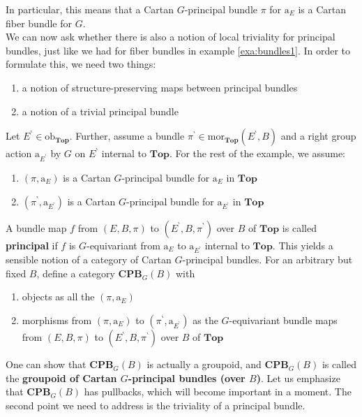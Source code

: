 \begin{exa}[Bundles 2]
In particular, this means that a Cartan $G$-principal bundle $\pi$ for $\mathrm{a}_{E}$ is a Cartan fiber bundle for $G$.
\\
We can now ask whether there is also a notion of local triviality for principal bundles, just like we had for fiber bundles in example \ref{exa:bundles1}.
In order to formulate this, we need two things:
\begin{enumerate}
\item[(1)]
a notion of structure-preserving maps between principal bundles
\item[(2)]
a notion of a trivial principal bundle
\end{enumerate}
Let $E^{\backprime} \in \mathrm{ob}_{\mathbf{Top}}$.
Further, assume a bundle $\pi^{\backprime} \in \mathrm{mor}_{\mathbf{Top}}(E^{\backprime},B)$ and a right group action $\mathrm{a}_{E^{\backprime}}$ by $G$ on $E^{\backprime}$ internal to $\mathbf{Top}$.
For the rest of the example, we assume:
\begin{enumerate}
\item[$\bullet$]
$(\pi,\mathrm{a}_{E})$ is a Cartan $G$-principal bundle for $\mathrm{a}_{E}$ in $\mathbf{Top}$
\item[$\bullet$]
$(\pi^{\backprime},\mathrm{a}_{E^{\backprime}})$ is a Cartan $G$-principal bundle for $\mathrm{a}_{E^{\backprime}}$ in $\mathbf{Top}$
\end{enumerate}
A bundle map $f$ from $(E,B,\pi)$ to $(E^{\backprime},B,\pi^{\backprime})$ over $B$ of $\mathbf{Top}$ is called \textbf{principal} if $f$ is $G$-equivariant from $\mathrm{a}_{E}$ to $\mathrm{a}_{E^{\backprime}}$ internal to $\mathbf{Top}$.
This yields a sensible notion of a category of Cartan $G$-principal bundles.
For an arbitrary but fixed $B$, define a category $\mathbf{CPB}_{G}(B)$ with
\begin{enumerate}
\item[$\bullet$]
objects as all the $(\pi,\mathrm{a}_{E})$
\item[$\bullet$]
morphisms from $(\pi,\mathrm{a}_{E})$ to $(\pi^{\backprime},\mathrm{a}_{E^{\backprime}})$ as the $G$-equivariant bundle maps from $(E,B,\pi)$ to $(E^{\backprime},B,\pi^{\backprime})$ over $B$ of $\mathbf{Top}$
\end{enumerate}
One can show that $\mathbf{CPB}_{G}(B)$ is actually a groupoid, and $\mathbf{CPB}_{G}(B)$ is called the \textbf{groupoid of Cartan $G$-principal bundles (over $B$)}.
Let us emphasize that $\mathbf{CPB}_{G}(B)$ has pullbacks, which will become important in a moment.
The second point we need to address is the triviality of a principal bundle.

\end{exa}
